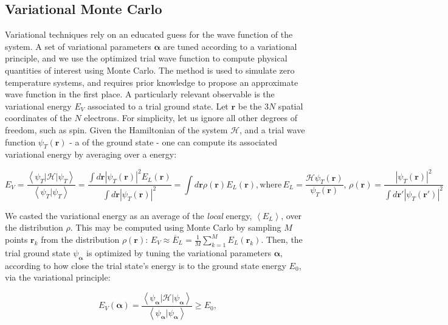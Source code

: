 \subsection{Variational Monte Carlo}

Variational techniques rely on an educated guess for the wave function of the system.
A set of variational parameters $\bm \alpha$ are tuned according to a variational principle, and we use the optimized trial wave function to compute physical quantities of interest using Monte Carlo.
The method is used to simulate zero temperature systems, and requires prior knowledge to propose an approximate wave function in the first place.
A particularly relevant observable is the variational energy $E_V$ associated to a trial ground state.
Let $\bm r$ be the $3N$ spatial coordinates of the $N$ electrons.
For simplicity, let us ignore all other degrees of freedom, such as spin.
Given the Hamiltonian of the system $\mathcal{H}$, and a trial wave function $\psi_T (\bm r)$ - a  of the ground state - one can compute its associated variational energy by averaging over a  energy:

\begin{equation}\label{eq:variational_energy}
E_V = \frac{\left\langle \psi_T | \mathcal{H} | \psi_T \right \rangle}{\left\langle \psi_T | \psi_T \right \rangle} = \frac{ \int d\bm r |\psi_T (\bm r)|^2 E_L (\bm r)}{\int d\bm r | \psi_T (\bm r)|^2 } = \int d\bm r\rho (\bm r) E_L (\bm r) , \text{where} \, 
E_L = \frac{\mathcal{H} \psi_T (\bm r) }{\psi_T (\bm r)} , \, \rho (\bm r) = \frac{ | \psi_T (\bm r) |^2}{ \int d\bm r' | \psi_T (\bm r') |^2}
\end{equation}

We casted the variational energy as an average of the \emph{local} energy, $\left\langle E_L \right\rangle $, over the distribution $\rho$.
This may be computed using Monte Carlo by sampling $M$ points $\bm r_k$ from the distribution $\rho (\bm r)$:
$
E_V \approx \overline{E}_L = \frac{1}{M} \sum_{k= 1}^{M} E_L (\bm r_k)
$.
Then, the trial ground state $\psi_{\bm \alpha}$ is optimized by tuning the  variational parameters ${\bm \alpha}$, according to how close the trial state's energy is to the ground state energy $E_0$, via the variational principle:

\begin{equation}
E_V(\bm \alpha) = \frac{\left\langle \psi_{\bm \alpha} | \mathcal{H} | \psi_{\bm \alpha} \right\rangle}{\left\langle\psi_{\bm \alpha} | \psi_{\bm \alpha} \right\rangle} \ge E_0,
\end{equation}

